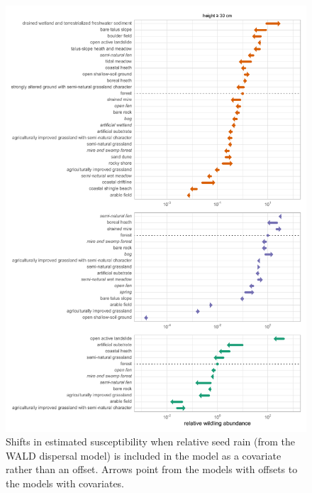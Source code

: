 \documentclass[
]{article}
\begin{document}
\begin{figure}
\centering
\includegraphics{figures/susceptibility-sensitivity-offset.pdf}
\caption{\label{fig:sensitivity-offset}Shifts in estimated susceptibility when relative seed rain (from the WALD dispersal model) is included in the model as a covariate rather than an offset. Arrows point from the models with offsets to the models with covariates.}
\end{figure}
\end{document}
